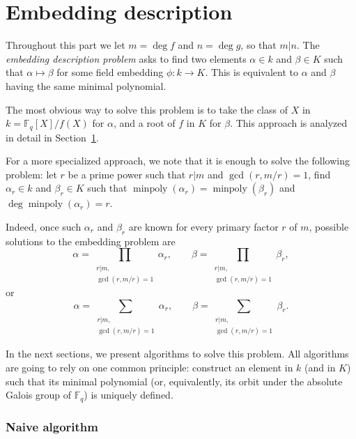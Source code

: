 \documentclass[12pt]{article}
\theoremstyle{plain}
\theoremstyle{definition}
\DeclareMathOperator{\minpoly}{minpoly}
\def\F{\ensuremath{\mathbb{F}}}
\newcounter{algorithm}
\begin{document}
\part{Embedding description}

Throughout this part we let $m=\deg f$ and $n=\deg g$, so that
$m|n$. The \emph{embedding description problem} asks to find two
elements $\alpha\in k$ and $\beta\in K$ such that $\alpha\mapsto\beta$
for some field embedding $\phi:k\to K$. This is equivalent to
$\alpha$ and $\beta$ having the same minimal polynomial.

The most obvious way to solve this problem is to take the class of $X$
in $k=\F_q[X]/f(X)$ for $\alpha$, and a root of $f$ in $K$ for
$\beta$. This approach is analyzed in detail in
Section~\ref{sec:description-naive}.

For a more specialized approach, we note that it is enough to solve
the following problem: let $r$ be a prime power such that $r|m$ and
$\gcd(r,m/r)=1$, find $\alpha_r\in k$ and $\beta_r\in K$ such that
$\minpoly(\alpha_r)=\minpoly(\beta_r)$ and $\deg\minpoly(\alpha_r)=r$.

Indeed, once such $\alpha_r$ and $\beta_r$ are known for every primary
factor $r$ of $m$, possible solutions to the embedding problem are
\begin{equation*}
  \alpha = \prod_{\substack{r|m,\\\gcd(r,m/r)=1}}\alpha_r,\qquad
  \beta = \prod_{\substack{r|m,\\\gcd(r,m/r)=1}}\beta_r,
\end{equation*}
or
\begin{equation*}
  \alpha = \sum_{\substack{r|m,\\\gcd(r,m/r)=1}}\alpha_r,\qquad
  \beta = \sum_{\substack{r|m,\\\gcd(r,m/r)=1}}\beta_r.
\end{equation*}

In the next sections, we present algorithms to solve this problem. All
algorithms are going to rely on one common principle: construct an
element in $k$ (and in $K$) such that its minimal polynomial (or,
equivalently, its orbit under the absolute Galois group of $\F_q$) is
uniquely defined.


\section{Naive algorithm}
\label{sec:description-naive}
\end{document}

